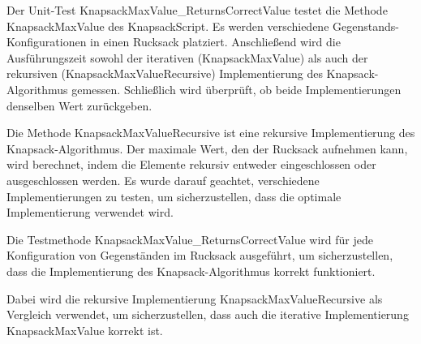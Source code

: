 Der Unit-Test KnapsackMaxValue_ReturnsCorrectValue testet die Methode KnapsackMaxValue des KnapsackScript. Es werden
verschiedene Gegenstands-Konfigurationen in einen Rucksack platziert. Anschließend wird die Ausführungszeit sowohl der
iterativen (KnapsackMaxValue) als auch der rekursiven (KnapsackMaxValueRecursive) Implementierung des Knapsack-Algorithmus
gemessen. Schließlich wird überprüft, ob beide Implementierungen denselben Wert zurückgeben.

Die Methode KnapsackMaxValueRecursive ist eine rekursive Implementierung des Knapsack-Algorithmus. Der maximale Wert, den
der Rucksack aufnehmen kann, wird berechnet, indem die Elemente rekursiv entweder eingeschlossen oder ausgeschlossen werden.
Es wurde darauf geachtet, verschiedene Implementierungen zu testen, um sicherzustellen, dass die optimale Implementierung verwendet wird.

Die Testmethode KnapsackMaxValue_ReturnsCorrectValue wird für jede Konfiguration von Gegenständen im Rucksack ausgeführt,
um sicherzustellen, dass die Implementierung des Knapsack-Algorithmus korrekt funktioniert.

Dabei wird die rekursive Implementierung KnapsackMaxValueRecursive als Vergleich verwendet, um sicherzustellen, dass
auch die iterative Implementierung KnapsackMaxValue korrekt ist.







